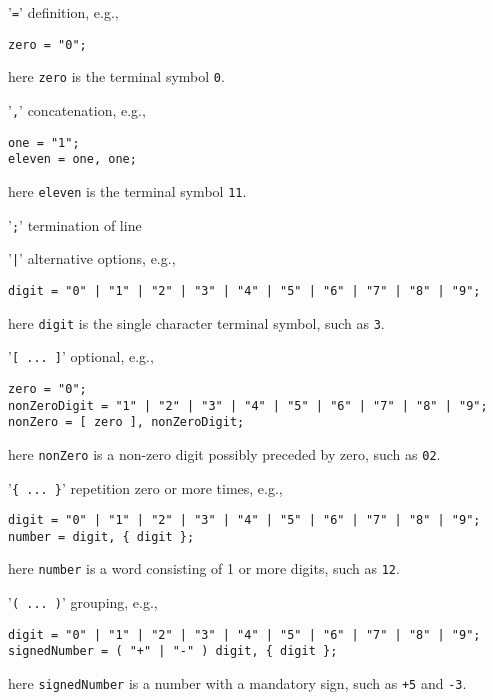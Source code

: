 \begin{description}
\item '\lstinline[language=ebnf]|=|' definition, e.g., 
  \begin{lstlisting}[language=ebnf]
zero = "0";
  \end{lstlisting}
  here \lstinline[language=ebnf]|zero| is the terminal symbol \lstinline[language=ebnf]|0|.
\item '\lstinline[language=ebnf]|,|' concatenation, e.g.,
  \begin{lstlisting}[language=ebnf]
one = "1";
eleven = one, one;
  \end{lstlisting}
  here \lstinline[language=ebnf]|eleven| is the terminal symbol \lstinline[language=ebnf]|11|.
\item '\lstinline[language=ebnf]|;|' termination of line
\item '\lstinline[language=ebnf]!|!' alternative options, e.g.,
  \begin{lstlisting}[language=ebnf]
digit = "0" | "1" | "2" | "3" | "4" | "5" | "6" | "7" | "8" | "9";
  \end{lstlisting}
  here \lstinline[language=ebnf]|digit| is the single character terminal symbol, such as \lstinline[language=ebnf]|3|.
\item '\lstinline[language=ebnf]|[ ... ]|' optional, e.g.,
  \begin{lstlisting}[language=ebnf]
zero = "0";
nonZeroDigit = "1" | "2" | "3" | "4" | "5" | "6" | "7" | "8" | "9";
nonZero = [ zero ], nonZeroDigit;
  \end{lstlisting}
  here \lstinline[language=ebnf]|nonZero| is a non-zero digit possibly preceded by zero, such as \lstinline[language=ebnf]|02|.
\item '\lstinline[language=ebnf]|{ ... }|' repetition zero or more times, e.g., 
  \begin{lstlisting}[language=ebnf]
digit = "0" | "1" | "2" | "3" | "4" | "5" | "6" | "7" | "8" | "9";
number = digit, { digit };
  \end{lstlisting}
  here \lstinline[language=ebnf]|number| is a word consisting of 1 or more digits, such as \lstinline[language=ebnf]|12|.
\item '\lstinline[language=ebnf]|( ... )|' grouping, e.g.,
  \begin{lstlisting}[language=ebnf]
digit = "0" | "1" | "2" | "3" | "4" | "5" | "6" | "7" | "8" | "9";
signedNumber = ( "+" | "-" ) digit, { digit };
  \end{lstlisting}
  here \lstinline[language=ebnf]|signedNumber| is a number with a mandatory sign, such as \lstinline[language=ebnf]|+5| and \lstinline[language=ebnf]|-3|.

\end{description}
